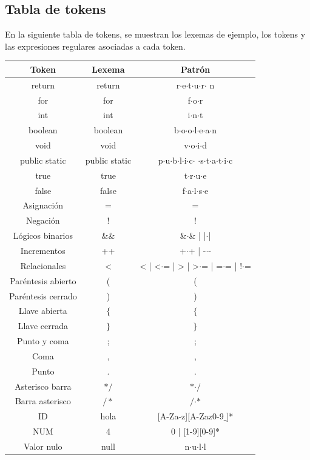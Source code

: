 \documentclass[12pt,a4paper]{article}
\begin{document}
\subsection{Tabla de tokens}
En la siguiente tabla de tokens, se muestran los lexemas de ejemplo, los tokens y las expresiones regulares asociadas a cada token.
\begin{center}
		\begin{tabular}{|c|c|c|}
			\hline 
			\textbf{Token} & \textbf{Lexema} & \textbf{Patrón} \\ 
			\hline 
			return & return & r$\cdot$e$\cdot$t$\cdot$u$\cdot$r$\cdot$ n  \\ 
			\hline 
			for & for & f$\cdot$o$\cdot$r \\ 
			\hline 
			int & int & i$\cdot$n$\cdot$t \\ 
			\hline 
			boolean	& boolean & b$\cdot$o$\cdot$o$\cdot$l$\cdot$e$\cdot$a$\cdot$n \\ 
			\hline 
			void	& void & v$\cdot$o$\cdot$i$\cdot$d \\ 
			\hline 
			public static	& public static & p$\cdot$u$\cdot$b$\cdot$l$\cdot$i$\cdot$c$\cdot$ $\cdot$s$\cdot$t$\cdot$a$\cdot$t$\cdot$i$\cdot$c \\ 
			\hline 
			true	& true & t$\cdot$r$\cdot$u$\cdot$e \\ 
			\hline 
				false	& false & f$\cdot$a$\cdot$l$\cdot$s$\cdot$e \\ 
			\hline 
			Asignación	& = & = \\ 
			\hline
			Negación	& ! & ! \\ 
			\hline
			Lógicos binarios	& \&\& &  \&$\cdot$\& | |$\cdot$| \\ 
			\hline
			Incrementos	& ++ &  +$\cdot$+ | -$\cdot$- \\ 
			\hline
			Relacionales	& < &  < | <$\cdot$= | > | >$\cdot$= | =$\cdot$= | !$\cdot$= \\ 
			\hline
			Paréntesis abierto	& ( & ( \\ 
			\hline 
			Paréntesis cerrado	& ) & ) \\ 
			\hline 
			Llave abierta	& $\{$ & $\{$ \\ 
			\hline 
			Llave cerrada	& $\}$ & $\}$ \\ 
			\hline 
			Punto y coma	& ; & ; \\ 
			\hline 
			Coma	& , &  , \\ 
			\hline
			Punto	& . &  . \\ 
			\hline
			Asterisco barra & $\ast/$  & $\ast$$\cdot/$ \\ 
			\hline 
			Barra asterisco & $/\ast$  &  $/$$\cdot$$\ast$ \\ 
			\hline  
			ID	& hola  & [A-Za-z][A-Zaz0-9$\_$]* \\ 
			\hline 
				NUM	& 4  & 0 | [1-9][0-9]* \\ 
			\hline
				Valor nulo	& null  & n$\cdot$u$\cdot$l$\cdot$l \\ 
			\hline  
			
		
		\end{tabular} 	
	\end{center}
\end{document}
